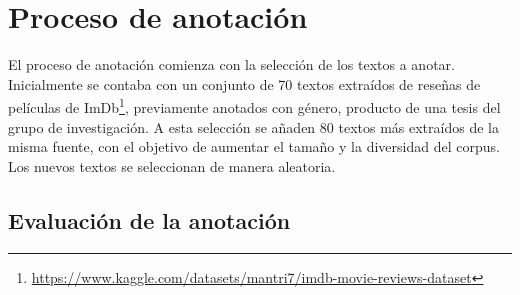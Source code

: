 \section{Proceso de anotaci\'on}
El proceso de anotaci\'on comienza con la selecci\'on de los textos a anotar. Inicialmente se contaba con un conjunto de 70 textos extra\'idos 
de rese\~nas de pel\'iculas de ImDb\footnote{\url{https://www.kaggle.com/datasets/mantri7/imdb-movie-reviews-dataset}}, previamente anotados 
con g\'enero, producto de una tesis del grupo de investigaci\'on. A esta selecci\'on se a\~naden 80 textos m\'as extra\'idos de la misma fuente,
con el objetivo de aumentar el tama\~no y la diversidad del corpus. Los nuevos textos se seleccionan de manera aleatoria.



\subsection{Evaluaci\'on de la anotaci\'on}


\begin{table}[htpb]
    \centering
    \caption{Resumen de m\'etricas de coincidencia entre anotadores.}
    \label{table:agreement}
\end{table}

